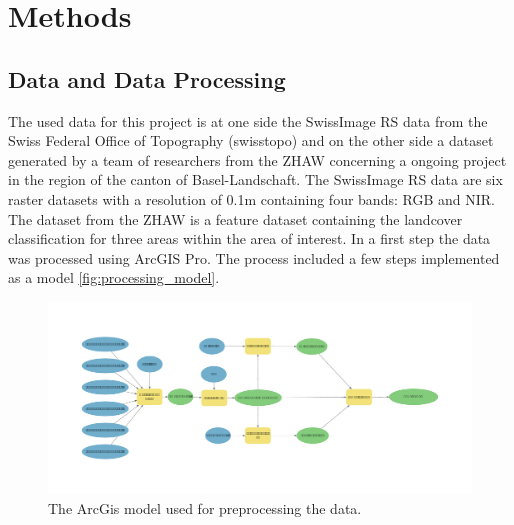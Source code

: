 

\section{Methods}
\label{methods}

\subsection{Data and Data Processing}%

The used data for this project is at one side the SwissImage RS data from the Swiss Federal Office of Topography (swisstopo)
and on the other side a dataset generated by a team of researchers from the ZHAW concerning a ongoing project in the region of
the canton of Basel-Landschaft. The SwissImage RS data are six raster datasets with a resolution of 0.1m containing four bands: 
RGB and NIR. The dataset from the ZHAW is a feature dataset containing the landcover classification for three areas within 
the area of interest. In a first step the data was processed using ArcGIS Pro. The process included a few steps implemented as
a model \autoref{fig:processing_model}.

\begin{figure}
    \centering
    \captionsetup{width=0.8\linewidth}
    \includegraphics[width=\linewidth]{figures/Model.pdf}
    \caption{The ArcGis model used for preprocessing the data.}
    \label{fig:processing_model}
\end{figure}

